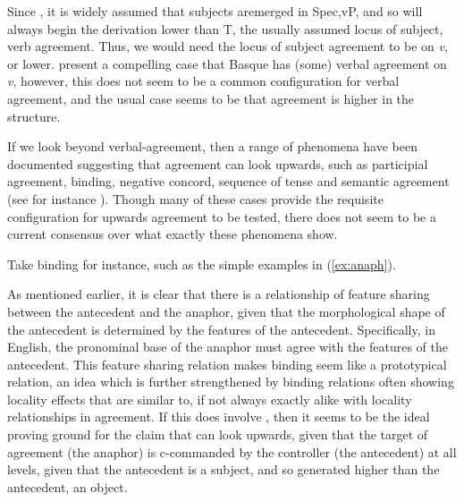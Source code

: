 \documentclass[output=paper
,modfonts
,nonflat]{langsci/langscibook}
\begin{document}
Since \citet{koopmansportiche1991}, it is widely assumed that subjects are\linebreak merged in Spec,vP, and so will always begin the derivation lower than T, the usually assumed locus of subject, verb agreement.
Thus, we would need the locus of subject agreement to be on \emph{v}, or lower.
\citet{bejarrezac2009} present a compelling case that Basque has (some) verbal agreement on \textit{v}, however, this does not seem to be a common configuration for verbal agreement, and the usual case seems to be that agreement is higher in the structure.

If we look beyond verbal-agreement, then a range of phenomena have been documented suggesting that agreement can look upwards, such as participial agreement, binding, negative concord, sequence of tense and semantic agreement (see for instance \citealp{Wurmbrand2012,Zeijlstra2012,smithdiss}).
Though many of these cases provide the requisite configuration for upwards agreement to be tested, there does not seem to be a current consensus over what exactly these phenomena show.

Take binding for instance, such as the simple examples in (\ref{ex:anaph}).

\begin{exe}
	\ex \label{ex:anaph}
	\begin{xlist}
	\end{xlist}
\end{exe}
As mentioned earlier, it is clear that there is a relationship of feature sharing between the antecedent and the anaphor, given that the morphological shape of the antecedent is determined by the features of the antecedent.
Specifically, in English, the pronominal base of the anaphor must agree with the features of the antecedent.
This feature sharing relation makes binding seem like a prototypical {\agr} relation, an idea which is further strengthened by binding relations often showing locality effects that are similar to, if not always exactly alike with locality relationships in agreement.
If this does involve \agr, then it seems to be the ideal proving ground for the claim that {\agr} can look upwards, given that the target of agreement (the anaphor) is c-commanded by the controller (the antecedent) at all levels, given that the antecedent is a subject, and so  generated higher than the antecedent, an object.
\end{document}
